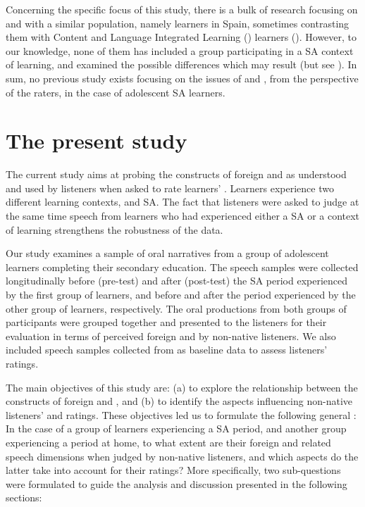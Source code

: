 \documentclass[output=paper]{langsci/langscibook}
\begin{document}
Concerning the specific focus of this study, there is a bulk of research  focusing on  and  with a similar population, namely   learners in Spain, sometimes contrasting them with Content and Language Integrated Learning () learners (\citealt{GarcíaLecumberriGallardodelPuerto2003,GallardodelPuertoEtAl2007,RalloJuan-Garau2011}). However, to our knowledge, none of them has included a group participating in a SA context of learning, and examined the possible differences which may result (but see \citealt{Llanes2012,LlanesMuñoz2012}). In sum, no previous study exists focusing on the issues of  and , from the perspective of the raters, in the case of adolescent SA  learners.


\section{The present study}

The current study aims at probing the constructs of foreign  and  as understood and used by listeners when asked to rate  learners’ . Learners experience two different learning contexts,  and SA. The fact that listeners were asked to judge at the same time speech from learners who had experienced either a SA  or a  context of learning strengthens the robustness of the data.

Our study examines a sample of oral narratives from a group of adolescent  learners completing their secondary education. The speech samples were collected longitudinally before (pre-test) and after (post-test) the SA period experienced by the first group of learners, and before and after the  period experienced by the other group of learners, respectively. The oral productions from both groups of participants were grouped together and presented to the listeners for their evaluation in terms of perceived foreign  and  by non-native listeners. We also included speech samples collected from  as baseline data to assess listeners’ ratings. 

\newpage
The main objectives of this study are: (a) to explore the relationship between the constructs of foreign  and , and (b) to identify the aspects influencing non-native listeners’  and  ratings. These objectives led us to formulate the following general : In the case of a group of  learners experiencing a SA period, and another group experiencing a  period at home, to what extent are their foreign  and  related speech dimensions when judged by non-native listeners, and which aspects do the latter take into account for their ratings? More specifically, two sub-questions were formulated to guide the analysis and discussion presented in the following sections:
\end{document}
